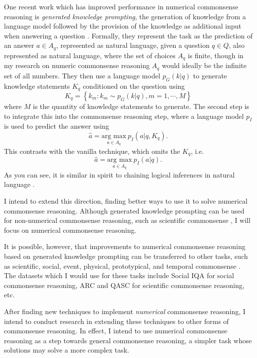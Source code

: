 \documentclass[12pt]{report}
\begin{document}
One recent work which has improved performance in numerical commonsense reasoning is \textit{generated knowledge prompting}, the generation of knowledge from a language model followed by the provision of the knowledge as additional input when answering a question \cite{Liu2021-iq}.
Formally, they represent the task as the prediction of an answer $a \in A_q$, represented as natural language, given a question $q \in Q$, also represented as natural language, where the set of choices $A_q$ is finite, though in my research on numeric commonsense reasoning $A_q$ would ideally be the infinite set of all numbers.
They then use a language model $p_G(k|q)$ to generate knowledge statements $K_q$ conditioned on the question using
\begin{equation*}
    K_q = \left\{k_m: k_m \sim p_G(k|q), m = 1, \cdots, M \right\}
\end{equation*}
where $M$ is the quantity of knowledge statements to generate.
The second step is to integrate this into the commonsense reasoning step, where a language model $p_I$ is used to predict the answer using
\begin{equation*}
    \hat{a} = \underset{a \in A_q}{\text{arg\ max}}\ p_I(a|q,K_q).
\end{equation*}
This contrasts with the vanilla technique, which omits the $K_q$, i.e.
\begin{equation*}
    \hat{a} = \underset{a \in A_q}{\text{arg\ max}}\ p_I(a|q).
\end{equation*}
As you can see, it is similar in spirit to chaining logical inferences in natural language \cite{Wei2022-nf}.

I intend to extend this direction, finding better ways to use it to solve numerical commonsense reasoning.
Although generated knowledge prompting can be used for non-numerical commonsense reasoning, such as scientific commonsense \cite{Liu2021-iq}, I will focus on numerical commonsense reasoning.

It is possible, however, that improvements to numerical commonsense reasoning based on generated knowledge prompting can be transferred to other tasks, such as scientific, social, event, physical, prototypical, and temporal commonsense \cite{Bian2023-rj}.
The datasets which I would use for these tasks include Social IQA \cite{Sap2019-hu} for social commonsense reasoning, ARC \cite{Clark2018-md} and QASC \cite{Khot2020-dh} for scientific commonsense reasoning, etc.

After finding new techniques to implement \textit{numerical} commonsense reasoning, I intend to conduct research in extending these techniques to other forms of commonsense reasoning.
In effect, I intend to use numerical commonsense reasoning as a step towards general commonsense reasoning, a simpler task whose solutions may solve a more complex task.
\end{document}

